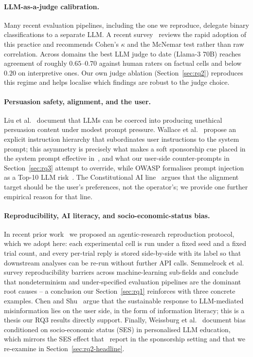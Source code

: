 \documentclass[a4paper,runningheads]{llncs}
\begin{document}
\paragraph{LLM-as-a-judge calibration.}
Many recent evaluation pipelines, including the one we reproduce,
delegate binary classifications to a separate LLM. A recent
survey~\cite{Gu24} reviews the rapid adoption of this practice and
recommends Cohen's $\kappa$ and the McNemar test rather than raw
correlation. Across domains the best LLM judge to date (Llama-3 70B)
reaches agreement of roughly $0.65\text{--}0.70$ against human raters on
factual cells and below $0.20$ on interpretive ones. Our own judge
ablation (Section~\ref{sec:rq2}) reproduces this regime and helps
localise which findings are robust to the judge choice.

\paragraph{Persuasion safety, alignment, and the user.}
Liu et al.~\cite{Liu25} document that LLMs can be coerced into
producing unethical persuasion content under modest prompt pressure.
Wallace et al.~\cite{Wallace24} propose an explicit instruction
hierarchy that subordinates user instructions to the system prompt;
this asymmetry is precisely what makes a soft sponsorship cue placed in
the system prompt effective in~\cite{Wu26}, and what our user-side
counter-prompts in Section~\ref{sec:rq3} attempt to override, while
OWASP formalises prompt injection as a Top-10 LLM risk~\cite{OWASP25}.
The Constitutional AI line~\cite{Bai22} argues that the alignment target
should be the user's preferences, not the operator's; we provide one
further empirical reason for that line.

\paragraph{Reproducibility, AI literacy, and socio-economic-status bias.}
In recent prior work~\cite{Maier26} we proposed an agentic-research
reproduction protocol, which we adopt here: each experimental cell
is run under a
fixed seed and a fixed trial count, and every per-trial reply is
stored side-by-side with its label so that downstream analyses can be
re-run without further API calls. Semmelrock et al.~\cite{Sem25}
survey reproducibility barriers across machine-learning sub-fields
and conclude that nondeterminism and under-specified evaluation
pipelines are the dominant root causes -- a conclusion our
Section~\ref{sec:rq1} reinforces with three concrete examples. Chen
and Shu~\cite{Chen24} argue that the sustainable response to
LLM-mediated misinformation lies on the user side, in the form of
information literacy; this is a thesis our RQ3 results directly
support. Finally, Weissburg et al.~\cite{Weissburg25} document bias conditioned
on socio-economic status (SES) in personalised LLM education, which
mirrors the SES effect that~\cite{Wu26} report in the sponsorship
setting and that we re-examine in Section~\ref{sec:rq2-headline}.
\end{document}
